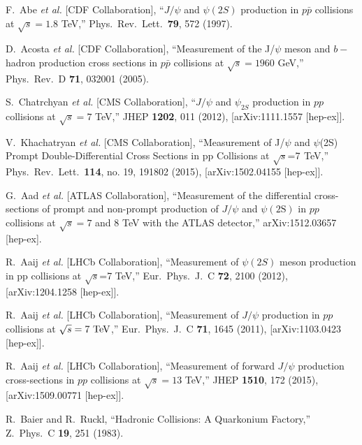 \documentclass[aps,prc,preprint,superscriptaddress,showpacs,showkeys,amsmath]{revtex4-1}
\begin{document}
\begin{thebibliography}{100}
  F.~Abe {\it et al.} [CDF Collaboration],
  ``$J/\psi$ and $\psi(2S)$ production in $p\bar{p}$ collisions at $\sqrt{s} = 1.8$ TeV,''
  Phys.\ Rev.\ Lett.\  {\bf 79}, 572 (1997).
  

  D.~Acosta {\it et al.}  [CDF Collaboration],
  ``Measurement of the J/$\psi$ meson and $b-$hadron production cross sections in $p\bar{p}$ collisions at $\sqrt{s} = 1960$ GeV,''
  Phys.\ Rev.\ D {\bf 71}, 032001 (2005).


  S.~Chatrchyan {\it et al.} [CMS Collaboration],
  ``$J/\psi$ and $\psi_{2S}$ production in $pp$ collisions at $\sqrt{s}=7$ TeV,''
  JHEP {\bf 1202}, 011 (2012),
  [arXiv:1111.1557 [hep-ex]].
  

  V.~Khachatryan {\it et al.} [CMS Collaboration],
  ``Measurement of J/$\psi$ and $\psi$(2S) Prompt Double-Differential Cross Sections in pp Collisions at $\sqrt{s}$=7  TeV,''
  Phys.\ Rev.\ Lett.\  {\bf 114}, no. 19, 191802 (2015),
  [arXiv:1502.04155 [hep-ex]].


  G.~Aad {\it et al.} [ATLAS Collaboration],
  ``Measurement of the differential cross-sections of prompt and non-prompt production of $J/\psi$ 
  and $\psi(2\mathrm{S})$ in $pp$ collisions at $\sqrt{s} = 7$ and $8$ TeV with the ATLAS detector,''
  arXiv:1512.03657 [hep-ex].


  R.~Aaij {\it et al.} [LHCb Collaboration],
  ``Measurement of $\psi(2S)$ meson production in pp collisions at $\sqrt{s}$=7 TeV,''
  Eur.\ Phys.\ J.\ C {\bf 72}, 2100 (2012),
  [arXiv:1204.1258 [hep-ex]].


  R.~Aaij {\it et al.} [LHCb Collaboration],
  ``Measurement of $J/\psi$ production in $pp$ collisions at $\sqrt{s}=7~\rm{TeV}$,''
  Eur.\ Phys.\ J.\ C {\bf 71}, 1645 (2011),
  [arXiv:1103.0423 [hep-ex]].

  R.~Aaij {\it et al.} [LHCb Collaboration],
  ``Measurement of forward $J/\psi$ production cross-sections in $pp$ collisions at $\sqrt{s}=13$ TeV,''
  JHEP {\bf 1510}, 172 (2015), [arXiv:1509.00771 [hep-ex]].
 




  R.~Baier and R.~Ruckl,
  ``Hadronic Collisions: A Quarkonium Factory,''
  Z.\ Phys.\ C {\bf 19}, 251 (1983).



\end{thebibliography}
\end{document}
